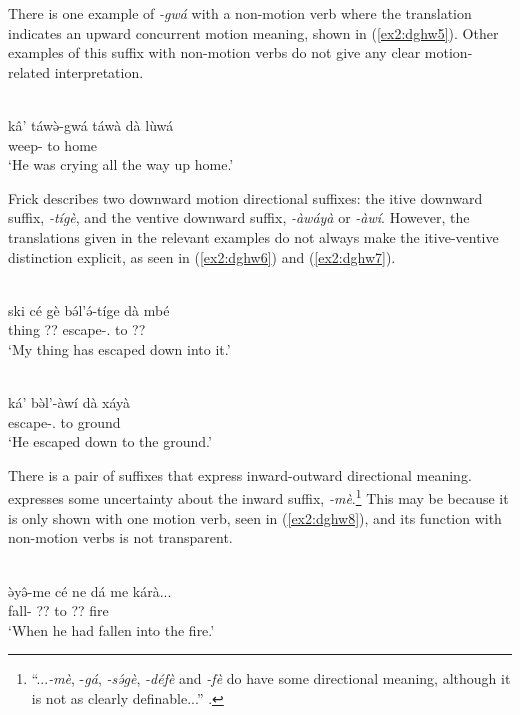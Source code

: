 There is one example of \textit{-gwá} with a non-motion verb where the translation indicates an upward concurrent motion meaning, shown in (\ref{ex2:dghw5}). Other examples of this suffix with non-motion verbs do not give any clear motion-related interpretation. 

\ea\label{ex2:dghw5}
 \\
\gll kâ' táwə̀-gwá táwà dà lùwá \\
 weep-  to home \\
\glt `He was crying all the way up home.'
\z 

Frick describes two downward motion directional suffixes: the itive downward suffix, \textit{-tígè}, and the ventive downward suffix, \textit{-àwáyà} or \textit{-àwí}. However, the translations given in the relevant examples do not always make the itive-ventive distinction explicit, as seen in (\ref{ex2:dghw6}) and (\ref{ex2:dghw7}). 

\ea\label{ex2:dghw6}
 \\
\gll  ski cé gè bə́l'ə́-tíge dà mbé \\
thing  ?? escape-. to ?? \\
\glt `My thing has escaped down into it.'

\ex\label{ex2:dghw7}
 \\
\gll  ká' bə̀l'-àwí dà xáyà \\
 escape-. to ground	\\
\glt `He escaped down to the ground.'
\z

There is a pair of suffixes that express inward-outward directional meaning. \citet[19]{frickVerbalSystemDghwede1978} expresses some uncertainty about the inward suffix, \textit{-mè}.\footnote{ ``...\textit{-mè}, -\textit{gá}, \textit{-sə́gè}, \textit{-défè} and \textit{-fè} do have some directional meaning, although it is not as clearly definable...'' \citep[19]{frickVerbalSystemDghwede1978}.} This may be because it is only shown with one motion verb, seen in (\ref{ex2:dghw8}), and its function with non-motion verbs is not transparent. 

\ea\label{ex2:dghw8}
 \\
\gll ə̀yə̂-me cé ne dá me kárà... \\
fall-  ?? to ?? fire \\
\glt `When he had fallen into the fire.'
\z

